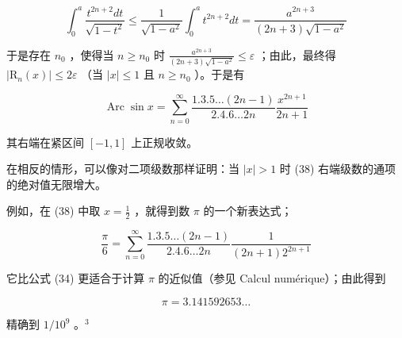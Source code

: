 \[
\int_ {0} ^ {a} \frac {t ^ {2 n + 2} d t}{\sqrt {1 - t ^ {2}}} \leqslant \frac {1}{\sqrt {1 - a ^ {2}}} \int_ {0} ^ {a} t ^ {2 n + 2} d t = \frac {a ^ {2 n + 3}}{(2 n + 3) \sqrt {1 - a ^ {2}}}
\]

于是存在 \(n_0\) ，使得当 \(n \geqslant n_0\) 时 \(\frac{a^{2n+3}}{(2n+3)\sqrt{1-a^2}} \leqslant \varepsilon\) ；由此，最终得 \(|\mathrm{R}_n(x)| \leqslant 2\varepsilon\) （当 \(|x| \leqslant 1\) 且 \(n \geqslant n_0\) ）。于是有

\[
\operatorname{Arc} \sin x = \sum_ {n = 0} ^ {\infty} \frac {1 . 3 . 5 \dots (2 n - 1)}{2 . 4 . 6 \dots 2 n} \frac {x ^ {2 n + 1}}{2 n + 1}\tag{38}
\]

其右端在紧区间 \([-1, 1]\) 上正规收敛。

在相反的情形，可以像对二项级数那样证明：当 \(|x| > 1\) 时 (38) 右端级数的通项的绝对值无限增大。

例如，在 (38) 中取 \(x = \frac{1}{2}\) ，就得到数 \(\pi\) 的一个新表达式；

\[
\frac {\pi}{6} = \sum_ {n = 0} ^ {\infty} \frac {1 . 3 . 5 \dots (2 n - 1)}{2 . 4 . 6 \dots 2 n} \frac {1}{(2 n + 1) 2 ^ {2 n + 1}}
\]

它比公式 (34) 更适合于计算 \(\pi\) 的近似值（参见 Calcul numérique）；由此得到

\[
\pi = 3. 1 4 1   5 9 2   6 5 3 \dots
\]

精确到 \(1/10^{9}\) 。\(^{3}\)
\relax{}
\setcounter{exercisegroup}{0}
